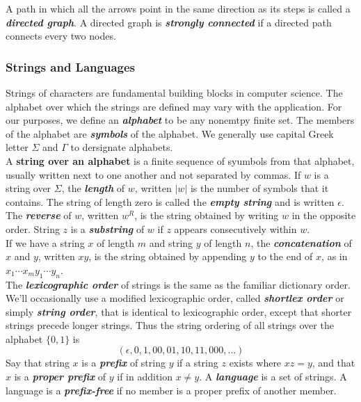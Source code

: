 \documentclass{article}
\theoremstyle{definition}
\newcommand{\define}[1]{\textbf{\textit{#1}}}
\begin{document}
A path in which all the arrows point in the same direction as its steps is called a \define{directed graph}. A directed graph is \define{strongly connected} if a directed path connects every two nodes. 

\subsubsection{Strings and Languages}

Strings of characters are fundamental building blocks in computer science. The alphabet over which the strings are defined may vary with the application. For our purposes, we define an \define{alphabet} to be any nonemtpy finite set. The members of the alphabet are \define{symbols} of the alphabet. We generally use capital Greek letter $\Sigma$ and $\Gamma$ to dersignate alphabets. \\ 

A \textbf{string over an alphabet} is a finite sequence of syumbols from that alphabet, usually written next to one another and not separated by commas. If $w$ is a string over $\Sigma$, the \define{length} of $w$, written $\vert w \vert$ is the number of symbols that it contains. The string of length zero is called the \define{empty string} and is written $\epsilon$. The \define{reverse} of $w$, written $w^{R}$, is the string obtained by writing $w$ in the opposite order. String $z$ is a \define{substring} of $w$ if $z$ appears consecutively within $w$. \\ 

If we have a string $x$ of length $m$ and string $y$ of length $n$, the \define{concatenation} of $x$ and $y$, written $xy$, is the string obtained by appending $y$ to the end of $x$, as in $x_1 \cdots x_{m}y_1 \cdots y_n$. \\ 

The \define{lexicographic order} of strings is the same as the familiar dictionary order. We'll occasionally use a modified lexicographic order, called \define{shortlex order} or simply \define{string order}, that is identical to lexicographic order, except that shorter strings precede longer strings. Thus the string ordering of all strings over the alphabet $\{0,1\}$ is $$(\epsilon,0,1,00,01,10,11,000,\dots)$$ Say that string $x$ is a \define{prefix} of string $y$ if a string $z$ exists where $xz = y$, and that $x$ is a \define{proper prefix} of $y$ if in addition $x \neq y$. A \define{language} is a set of strings. A language is a \define{prefix-free} if no member is a proper prefix of another member. 
\end{document}
